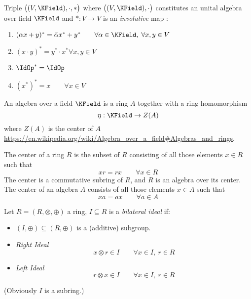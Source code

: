 \documentclass[a4paper,12pt]{scrartcl}    %
\begin{document}
			\begin{definition}
				Triple $\big( (V,\KField), \cdot, *\big)$ where $\big((V,\KField), \cdot\big)$ constitutes an unital algebra over field $\KField$ and $*:V\rightarrow V$ is an \emph{involutive} map :
				\begin{enumerate}
					\item $ (\alpha x + y)^* = \bar{\alpha} x^* + y^* \qquad \forall \alpha \in \KField, \; \forall x,y \in V$
					\item $(x \cdot y)^* = y^* \cdot x^* \forall x,y \in V$
					\item $\IdOp^* = \IdOp$
					\item $ (x^*)^* = x \qquad \forall x \in V$
				\end{enumerate}	
			\end{definition}
			
			
			\begin{observation}
			 An algebra over a field $\KField$ is a ring\cite{TonyAlgebra} $A$ together with a ring homomorphism
			\begin{displaymath}
				\eta : \KField \rightarrow Z(A)
			\end{displaymath}
			where $Z(A)$ is the center of $A$ \url{https://en.wikipedia.org/wiki/Algebra_over_a_field#Algebras_and_rings}.
			
				\begin{remark}
				The center of a ring $R$ is the subset of $R$ consisting of all those elements $x \in R$ such that 
				\begin{displaymath}
					x r = r x \qquad \forall x \in R
				\end{displaymath}
				The center is a commutative subring of $R$, and $R$ is an algebra over its center.\\
				The center of an algebra $A$ consists of all those elements $x \in A$ such that 
				\begin{displaymath}
					x a = a x \qquad \forall a \in A
				\end{displaymath}		
				\end{remark}				 
			\end{observation}

			\begin{remark}
				Let $R= (R, \otimes, \oplus)$ a ring, $ I\subseteq R$ is a \emph{bilateral ideal} if:
				\begin{itemize}
					\item 	$(I,\oplus) \subseteq ( R, \oplus)$ is a (additive) subgroup.
					\item \emph{Right Ideal}
						\begin{displaymath}
							x \otimes r \in I \qquad \forall x \in I , \: r \in R
						\end{displaymath}									
					\item \emph{Left Ideal}
						\begin{displaymath}
							r \otimes x \in I \qquad \forall x \in I , \: r \in R
						\end{displaymath}									
				\end{itemize}
				(Obviously $I$ is a subring.)
			\end{remark}
			
\end{document}
